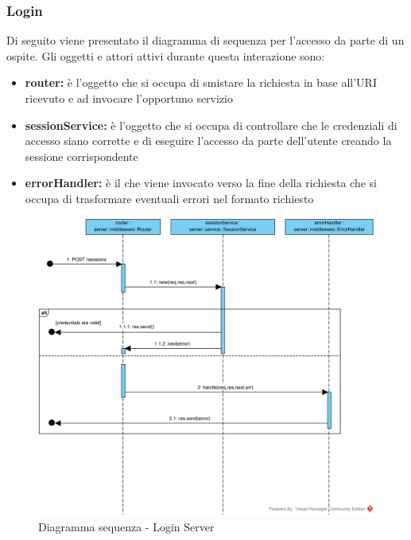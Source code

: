 \documentclass[12pt,a4paper]{article}
\begin{document}
\subsubsection{Login}
Di seguito viene presentato il diagramma di sequenza per l'accesso da parte di un ospite. Gli oggetti e attori attivi durante questa interazione sono:

\begin{itemize}
	\item \textbf{router:} è l'oggetto che si occupa di smistare la richiesta in base all’URI ricevuto e ad invocare l’opportuno servizio	
	\item \textbf{sessionService:} è l'oggetto che si occupa di controllare che le credenziali di accesso siano corrette e di eseguire l'accesso da parte dell'utente creando la sessione corrispondente
	\item \textbf{errorHandler:} è il  che viene invocato verso la fine della richiesta che si occupa di trasformare eventuali errori nel formato  richiesto
\end{itemize}

\begin{center}
	\begin{figure}[H]
		\centering \includegraphics[max width=\myheight, angle=90]{../img/diagrammiSequenza/loginServer.png}
		\caption{Diagramma sequenza - Login Server}
	\end{figure}
\end{center}
\end{document}
